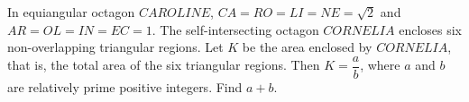 In equiangular octagon $CAROLINE$, $CA=RO=LI=NE=\sqrt2$ and $AR=OL=IN=EC=1$. The self-intersecting octagon $CORNELIA$ encloses six non-overlapping triangular regions. Let $K$ be the area enclosed by $CORNELIA$, that is, the total area of the six triangular regions. Then $K=\dfrac ab$, where $a$ and $b$ are relatively prime positive integers. Find $a+b$.
